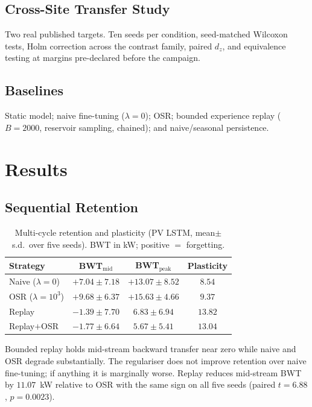 \documentclass[journal]{IEEEtran}
\newcommand{\ewclambda}{\lambda}
\begin{document}
\subsection{Cross-Site Transfer Study}
Two real published targets. Ten seeds per condition, seed-matched Wilcoxon
tests, Holm correction across the contrast family, paired $d_z$, and equivalence
testing at margins pre-declared before the campaign.

\subsection{Baselines}
Static model; naive fine-tuning ($\ewclambda{=}0$); OSR; bounded experience
replay ($B{=}2000$, reservoir sampling, chained); and naive/seasonal persistence.

\section{Results}
\label{sec:results}

\subsection{Sequential Retention}
\label{sec:results_seq}

\begin{table}[t]
\centering
\caption{Multi-cycle retention and plasticity (PV LSTM, mean$\pm$s.d.\ over five
seeds). BWT in kW; positive $=$ forgetting.}
\label{tab:multicycle}
\begin{tabular}{@{}lccc@{}}
\toprule
\textbf{Strategy} & \textbf{BWT}$_{\mathrm{mid}}$ & \textbf{BWT}$_{\mathrm{peak}}$
& \textbf{Plasticity} \\
\midrule
Naive ($\ewclambda{=}0$) & $+7.04\pm7.18$ & $+13.07\pm8.52$ & $8.54$ \\
OSR ($\ewclambda{=}10^3$) & $+9.68\pm6.37$ & $+15.63\pm4.66$ & $9.37$ \\
Replay & $\mathbf{-1.39\pm7.70}$ & $\mathbf{6.83\pm6.94}$ & $13.82$ \\
Replay${+}$OSR & $\mathbf{-1.77\pm6.64}$ & $\mathbf{5.67\pm5.41}$ & $13.04$ \\
\bottomrule
\end{tabular}
\end{table}

Bounded replay holds mid-stream backward transfer near zero while naive and OSR
degrade substantially. The regulariser does not improve retention over naive
fine-tuning; if anything it is marginally worse. Replay reduces mid-stream BWT
by $11.07$~kW relative to OSR with the same sign on all five seeds (paired
$t{=}6.88$, $p{=}0.0023$).
\end{document}
